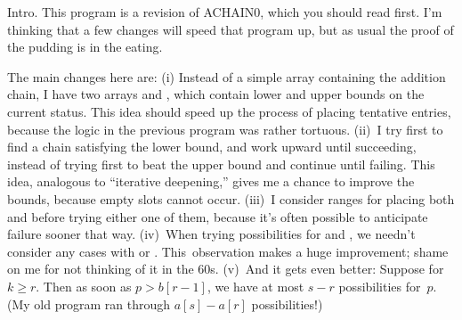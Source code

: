 
\srcloctrue
\datethis

Intro. This program is a revision of {\mc ACHAIN0}, which
you should
read first. I'm thinking that a few changes will speed that program up,
but as usual the proof of the pudding is in the eating.

The main changes here are: (i) Instead of a simple array  containing
the addition chain, I have two arrays  and , which contain
lower and upper bounds on the current status. This idea should
speed up the process of placing tentative entries, because the
logic in the previous program was rather tortuous. (ii)~I try first to
find a chain satisfying the lower bound, and work upward until
succeeding, instead of trying first to beat the upper bound and
continue until failing. This idea, analogous to ``iterative deepening,''
gives me a chance to improve the bounds, because empty slots cannot
occur. (iii)~I consider ranges for placing both  and 
before trying either one of them, because it's often possible
to anticipate failure sooner that way.
(iv)~When trying possibilities for  and , we
needn't consider any cases with  or .
This~observation makes a huge improvement; shame on me for not
thinking of it in the 60s.
(v)~And it gets even better: Suppose  for $k\ge r$.
Then as soon as $p>b[r-1]$, we have at most $s-r$ possibilities
for~$p$. (My old program ran through $a[s]-a[r]$ possibilities!)

